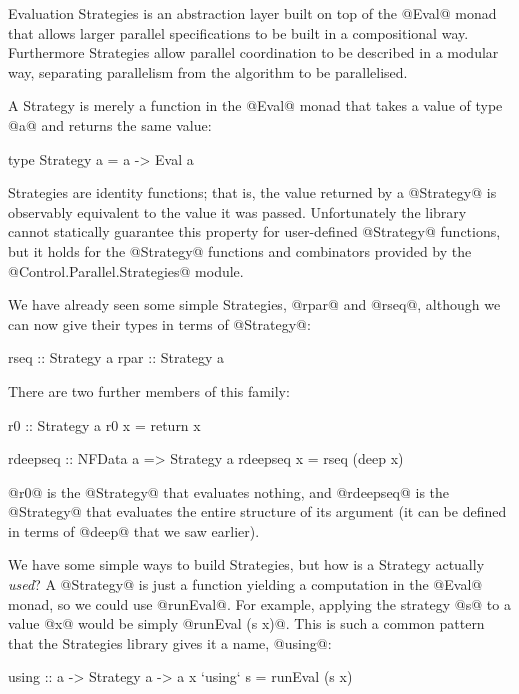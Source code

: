 Evaluation Strategies \cite{trinder:strategies,seq-no-more} is an abstraction
layer built on top of the @Eval@ monad that allows larger parallel
specifications to be built in a compositional way.  Furthermore
Strategies allow parallel coordination to be described in a modular
way, separating parallelism from the algorithm to be parallelised.

A Strategy is merely a function in the @Eval@ monad that takes a value
of type @a@ and returns the same value:

\begin{haskell}
type Strategy a = a -> Eval a
\end{haskell}

\noindent Strategies are identity functions; that is, the value
returned by a @Strategy@ is observably equivalent to the value it was
passed.  Unfortunately the library cannot statically guarantee this
property for user-defined @Strategy@ functions, but it holds for the
@Strategy@ functions and combinators provided by the
@Control.Parallel.Strategies@ module.

We have already seen some simple Strategies, @rpar@ and @rseq@,
although we can now give their types in terms of @Strategy@:

\begin{haskell}
rseq :: Strategy a
rpar :: Strategy a
\end{haskell}

\noindent There are two further members of this family:

\begin{haskell}
r0 :: Strategy a
r0 x = return x

rdeepseq :: NFData a => Strategy a
rdeepseq x = rseq (deep x)
\end{haskell}

\noindent @r0@ is the @Strategy@ that evaluates nothing, and
@rdeepseq@ is the @Strategy@ that evaluates the entire structure of
its argument (it can be defined in terms of @deep@ that we saw
earlier).

We have some simple ways to build Strategies, but how is a Strategy
actually \emph{used}?  A @Strategy@ is just a function yielding a
computation in the @Eval@ monad, so we could use @runEval@.  For
example, applying the strategy @s@ to a value @x@ would be simply
@runEval (s x)@.  This is such a common pattern that the
Strategies library gives it a name, @using@:

\begin{haskell}
using :: a -> Strategy a -> a
x `using` s = runEval (s x)
\end{haskell}

